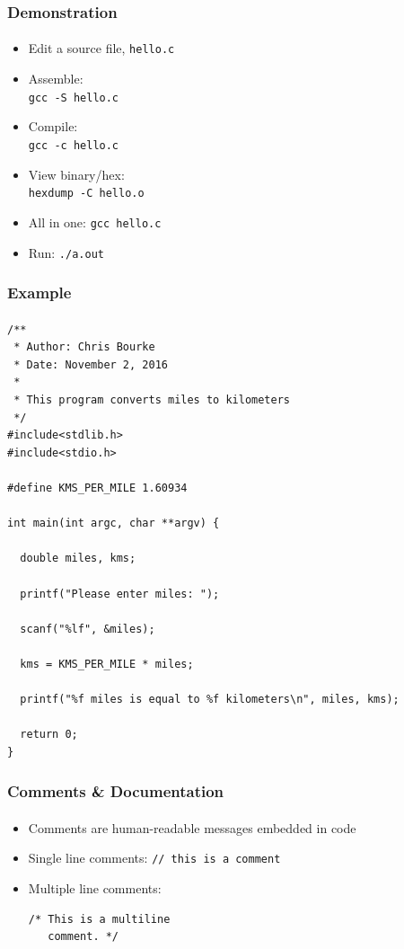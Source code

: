 \documentclass[]{beamer}
\begin{document}
\begin{frame}
    \frametitle{Demonstration}
    \framesubtitle{}

\begin{itemize}
  \item Edit a source file, \texttt{hello.c}
  \item Assemble: \\
  \texttt{gcc -S hello.c}
  \item Compile: \\
  \texttt{gcc -c hello.c}
  \item View binary/hex: \\
  \texttt{hexdump -C hello.o}
  \item All in one:
  \texttt{gcc hello.c}
  \item Run:
  \texttt{./a.out}
\end{itemize}

\end{frame}


\begin{frame}[fragile]
    \frametitle{Example}
    \framesubtitle{}

\begin{verbatim}
/**
 * Author: Chris Bourke
 * Date: November 2, 2016
 *
 * This program converts miles to kilometers
 */
#include<stdlib.h>
#include<stdio.h>

#define KMS_PER_MILE 1.60934

int main(int argc, char **argv) {

  double miles, kms;

  printf("Please enter miles: ");

  scanf("%lf", &miles);

  kms = KMS_PER_MILE * miles;

  printf("%f miles is equal to %f kilometers\n", miles, kms);

  return 0;
}
\end{verbatim}

\end{frame}

\begin{frame}[fragile]
    \frametitle{Comments \& Documentation}
    \framesubtitle{}

\begin{itemize}[<+->]
  \item Comments are human-readable messages embedded in code
  \item Single line comments: \texttt{// this is a comment}
  \item Multiple line comments: 
\begin{verbatim}
/* This is a multiline 
   comment. */
\end{verbatim}
\end{itemize}

\end{frame}
\end{document}

